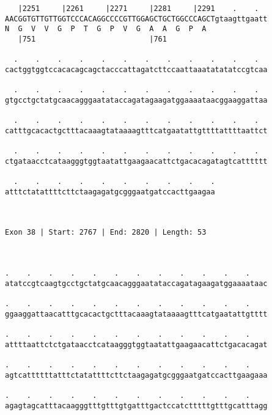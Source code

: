 \documentclass{article}
\begin{document}
\begin{Verbatim}
   |2251     |2261     |2271     |2281     |2291    .    .  
AACGGTGTTGTTGGTCCCACAGGCCCCGTTGGAGCTGCTGGCCCAGCTgtaagttgaatt
N  G  V  V  G  P  T  G  P  V  G  A  A  G  P  A              
   |751                          |761                       
  
  .    .    .    .    .    .    .    .    .    .    .    .  
cactggtggtccacacagcagctacccattagatcttccaattaaatatatatccgtcaa
                                                            
  .    .    .    .    .    .    .    .    .    .    .    .  
gtgcctgctatgcaacagggaatataccagatagaagatggaaaataacggaaggattaa
                                                            
  .    .    .    .    .    .    .    .    .    .    .    .  
catttgcacactgctttacaaagtataaaagtttcatgaatattgttttattttaattct
                                                            
  .    .    .    .    .    .    .    .    .    .    .    .  
ctgataacctcataagggtggtaatattgaagaacattctgacacagatagtcatttttt
                                                            
  .    .    .    .    .    .    .    .    .    .
atttctatattttcttctaagagatgcgggaatgatccacttgaagaa
                                                
                                                
 
Exon 38 | Start: 2767 | End: 2820 | Length: 53



.    .    .    .    .    .    .    .    .    .    .    .    
atatccgtcaagtgcctgctatgcaacagggaatataccagatagaagatggaaaataac
                                                            
.    .    .    .    .    .    .    .    .    .    .    .    
ggaaggattaacatttgcacactgctttacaaagtataaaagtttcatgaatattgtttt
                                                            
.    .    .    .    .    .    .    .    .    .    .    .    
attttaattctctgataacctcataagggtggtaatattgaagaacattctgacacagat
                                                            
.    .    .    .    .    .    .    .    .    .    .    .    
agtcattttttatttctatattttcttctaagagatgcgggaatgatccacttgaagaaa
                                                            
.    .    .    .    .    .    .    .    .    .    .    .    
agagtagcatttacaagggtttgtttgtgatttgactccatctttttgtttgcatttagg
                                                            

\end{Verbatim}
\end{document}
